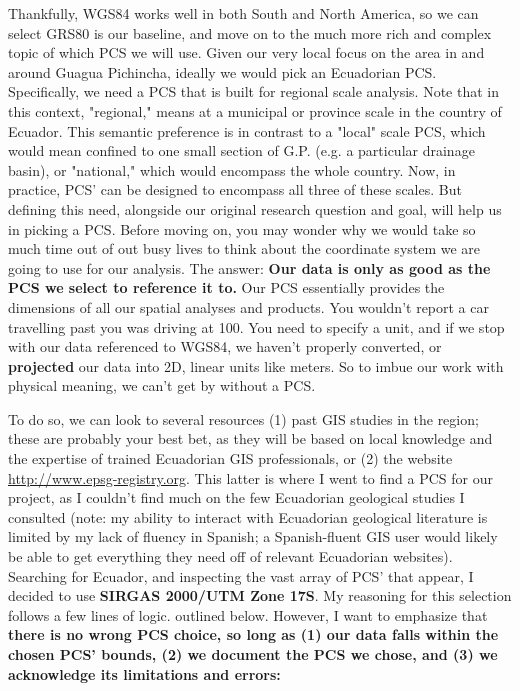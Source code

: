 \documentclass{article}
\begin{document}
Thankfully, WGS84 works well in both South and North America, so we can select GRS80 is our baseline, and move on to the much more rich and complex topic of which PCS we will use. Given our very local focus on the area in and around Guagua Pichincha, ideally we would pick an Ecuadorian PCS. Specifically, we need a PCS that is built for regional scale analysis. Note that in this context, "regional," means at a municipal or province scale in the country of Ecuador. This semantic preference is in contrast to a "local" scale PCS, which would mean confined to one small section of G.P. (e.g. a particular drainage basin), or "national," which would encompass the whole country. Now, in practice, PCS' can be designed to encompass all three of these scales.  But defining this need, alongside our original research question and goal, will help us in picking a PCS. Before moving on, you may wonder why we would take so much time out of out busy lives to think about the coordinate system we are going to use for our analysis. The answer: \textbf{Our data is only as good as the PCS we select to reference it to.} Our PCS essentially provides the dimensions of all our spatial analyses and products. You wouldn't report a car travelling past you was driving at 100. You need to specify a unit, and if we stop with our data referenced to WGS84, we haven't properly converted, or \textbf{projected} our data into 2D, linear units like meters. So to imbue our work with physical meaning, we can't get by without a PCS.

To do so, we can look to several resources (1) past GIS studies in the region; these are probably your best bet, as they will be based on local knowledge and the expertise of trained Ecuadorian GIS professionals, or (2) the website \url{http://www.epsg-registry.org}. This latter is where I went to find a PCS for our project, as I couldn't find much on the few Ecuadorian geological studies I consulted (note: my ability to interact with Ecuadorian geological literature is limited by my lack of fluency in Spanish; a Spanish-fluent GIS user would likely be able to get everything they need off of relevant Ecuadorian websites). Searching for Ecuador, and inspecting the vast array of PCS' that appear, I decided to use \textbf{SIRGAS 2000/UTM Zone 17S}. My reasoning for this selection follows a few lines of logic. outlined below. However, I want to emphasize that \textbf{there is no wrong PCS choice, so long as (1) our data falls within the chosen PCS' bounds, (2) we document the PCS we chose, and (3) we acknowledge its limitations and errors:}
\end{document}
